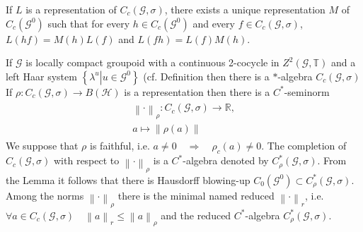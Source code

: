 \documentclass{beamer}
\theoremstyle{plain}
\newcommand{\G}{\mathcal{G}}
\newcommand{\T}{\mathbb{T}}
\newcommand{\la}{\lambda}
\renewcommand{\H}{\mathcal{H}}               %
\newcommand{\bean}{\begin{eqnarray*}}
\newcommand{\eean}{\end{eqnarray*}}
\begin{document}
\begin{frame}
	\begin{lemma}\label{groupoid_mult_repr_lem}
		If $L$ is a representation of $C_c\left(\G, \sigma\right)$, there exists a unique representation
		$M$ of $C_c\left(\G^0\right)$ such that for every $h \in C_c\left(\G^0\right)$ and every $f\in C_c\left(\G, \sigma\right)$, $L\left(h f \right)= M\left(h \right)L\left(f \right)$  and
		$L\left(fh \right)= L\left(f \right)M\left(h \right)$. 
	\end{lemma}
	
	If $\G$ is locally compact groupoid with a continuous 2-cocycle in $Z^2\left(\G, \T\right)$ and a left  Haar system $\left\{\la^u\left| u \in \G^0\right.\right\}$  (cf. Definition then there is a $*$-algebra $C_c\left(\G, \sigma \right)$
	If  $\rho: 	C_c\left(\G , \sigma \right)\to B\left(\H \right)$ is a representation then there is a $C^*$-seminorm 
	\bean
	\begin{split}
		\left\|\cdot  \right\|_\rho :   	C_c\left(\G , \sigma \right)\to \mathbb{R},\\
		a \mapsto \left\|\rho\left( a \right)  \right\|
	\end{split}
	\eean
	We suppose that $\rho$ is \alert{faithful}, i.e. $a \neq 0\quad \Rightarrow \quad \rho_c\left(a \right) \neq 0$. The completion of  $C_c\left(\G , \sigma \right)$ with respect to 	$\left\|\cdot  \right\|_\rho$ is a $C^*$-algebra denoted by $C^*_\rho\left(\G , \sigma \right)$. From the Lemma it follows that there is \alert{Hausdorff blowing-up} $C_0\left(\G^0 \right) \subset C^*_\rho\left(\G , \sigma \right)$. Among the norms $\left\|\cdot  \right\|_\rho$ there is the {minimal} named \alert{reduced} $\left\|\cdot  \right\|_r$, i.e. $\forall a \in 	C_c\left(\G , \sigma \right) \quad \left\|a \right\|_r\le \left\|a \right\|_\rho$ and the \alert{reduced} $C^*$-algebra $C^*_\rho\left(\G , \sigma \right)$.
\end{frame}
\end{document}
